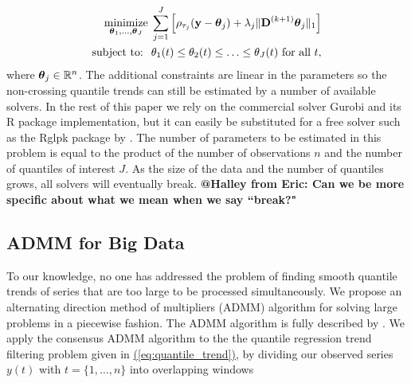 \documentclass[12pt]{article}
\makeatletter
\newcommand{\Halley}[2]{{\bf {\color{purple}@Halley from #1: #2}}\xspace}
\newcommand{\Eqn}[1]{\hyperref[eq:#1]{{\rm (\ref*{eq:#1})}}} %
\newcommand{\Eqn}[1]{{(\ref{eq:#1})}} %
\newcommand{\Real}{\mathbb{R}}
\newcommand{\V}[1]{{\bm{\mathbf{\MakeLowercase{#1}}}}} %
\newcommand{\M}[1]{{\bm{\mathbf{\MakeUppercase{#1}}}}} %
\newcommand{\Mn}[2]{\M{#1}^{(#2)}} %
\makeatother
\begin{document}
	\begin{eqnarray}
	\label{eq:noncross_trend}
	\underset{\V{\theta}_1, \ldots, \V{\theta}_J}{\text{minimize}}\; \sum_{j=1}^J \left [\rho_{\tau_j}(\V{y} - \V{\theta}_{j}) + 
	\lambda_j \lVert \Mn{D}{k+1} \V{\theta}_j \rVert_1 \right ] \\
	 \text{subject to: }\; \theta_{1}(t) \le \theta_{2}(t) \le \ldots \le \theta_{J}(t) \text{ for all } t, \nonumber
	\end{eqnarray}
	where $\V{\theta}_j \in \Real^n$. The additional constraints are linear in the parameters so the non-crossing quantile trends can still be estimated by a number of available solvers. In the rest of this paper we rely on the commercial solver Gurobi \citep{gurobi} and its R package implementation, but it can easily be substituted for a free solver such as the Rglpk package by \cite{rglpk}. The number of parameters to be estimated in this problem is equal to the product of the number of observations $n$ and the number of quantiles of interest $J$. As the size of the data and the number of quantiles grows, all solvers will eventually break. \Halley{Eric}{Can we be more specific about what we mean when we say ``break?"}
	
	\subsection{ADMM for Big Data}
	
	To our knowledge, no one has addressed the problem of finding smooth quantile trends of series that are too large to be processed simultaneously. We propose an alternating direction method of multipliers (ADMM) algorithm for solving large problems in a piecewise fashion. The ADMM algorithm \citep{gabay1975dual, glowinski1975approximation} is fully described by \cite{boyd2011distributed}. We apply the consensus ADMM algorithm to the the quantile regression trend filtering problem given in \Eqn{quantile_trend}, by dividing our observed series $y(t)$ with $t = \{1, \ldots, n\}$ into overlapping windows 
	
\end{document}

